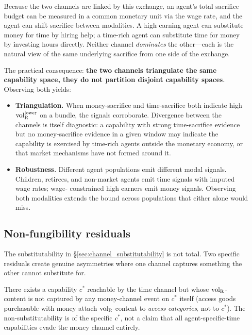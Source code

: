 Because the two channels are linked by this exchange, an agent's
total sacrifice budget can be measured in a common monetary unit
via the wage rate, and the agent can shift sacrifice between
modalities.  A high-earning agent can substitute money for time
by hiring help; a time-rich agent can substitute time for money
by investing hours directly.  Neither channel \emph{dominates}
the other---each is the natural view of the same underlying
sacrifice from one side of the exchange.

The practical consequence: \textbf{the two channels triangulate
the same capability space, they do not partition disjoint
capability spaces}.  Observing both yields:

\begin{itemize}
\item \textbf{Triangulation.}  When money-sacrifice and
  time-sacrifice both indicate high ${\operatorname{vol}_{\mathrm{R}}^{\mathrm{lower}}}$ on a bundle,
  the signals corroborate.  Divergence between the channels is
  itself diagnostic: a capability with strong time-sacrifice
  evidence but no money-sacrifice evidence in a given window
  may indicate the capability is exercised by time-rich agents
  outside the monetary economy, or that market mechanisms have
  not formed around it.
\item \textbf{Robustness.}  Different agent populations emit
  different modal signals.  Children, retirees, and non-market
  agents emit time signals with imputed wage rates; wage-
  constrained high earners emit money signals.  Observing both
  modalities extends the bound across populations that either
  alone would miss.
\end{itemize}

\subsection{Non-fungibility residuals}

The substitutability in \S\ref{sec:channel_substitutability} is
not total.  Two specific residuals create genuine asymmetries
where one channel captures something the other cannot substitute
for.

\begin{proposition}
\label{prop:agent_specific_time}
There exists a capability $c^\ast$ reachable by the time channel
but whose ${\operatorname{vol}_{\mathrm{R}}}$-content is not captured by any money-channel
event on $c^\ast$ itself (access goods purchasable with money
attach ${\operatorname{vol}_{\mathrm{R}}}$-content to \emph{access categories}, not to
$c^\ast$).  The non-substitutability is of the specific
$c^\ast$, not a claim that all agent-specific-time capabilities
evade the money channel entirely.
\end{proposition}

